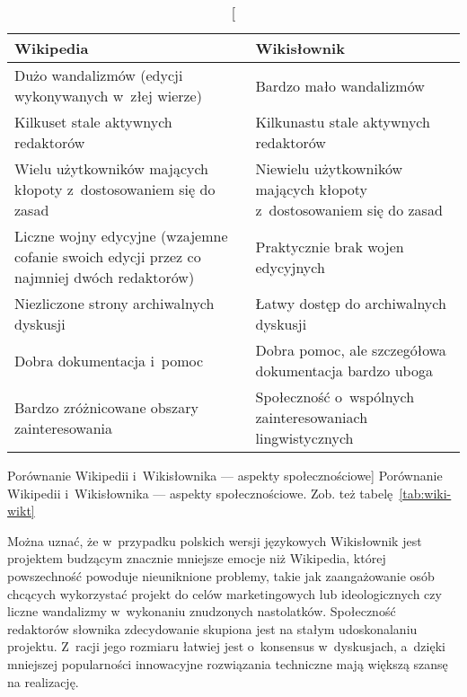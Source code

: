 \begin{table}[h]
\begin{center}
	\begin{tabularx}{\textwidth}{ XX }
		\toprule \textbf{Wikipedia} & \textbf{Wikisłownik} \\
		\midrule Dużo wandalizmów (edycji wykonywanych w~złej wierze)
			& Bardzo mało wandalizmów \\
		\midrule Kilkuset stale aktywnych redaktorów
			& Kilkunastu stale aktywnych redaktorów \\
		\midrule Wielu użytkowników mających kłopoty z~dostosowaniem się do zasad
			& Niewielu użytkowników mających kłopoty z~dostosowaniem się do zasad \\
		\midrule Liczne wojny edycyjne (wzajemne cofanie swoich edycji przez co najmniej dwóch redaktorów)
			& Praktycznie brak wojen edycyjnych \\
		\midrule Niezliczone strony archiwalnych dyskusji
			& Łatwy dostęp do archiwalnych dyskusji \\
		\midrule Dobra dokumentacja i~pomoc
			& Dobra pomoc, ale szczegółowa dokumentacja bardzo uboga \\
		\midrule Bardzo zróżnicowane obszary zainteresowania
			& Społeczność o~wspólnych zainteresowaniach lingwistycznych \\
		\bottomrule
	\end{tabularx}
\caption
	[Porównanie Wikipedii i~Wikisłownika --- aspekty społecznościowe]
	{Porównanie Wikipedii i~Wikisłownika --- aspekty społecznościowe. Zob. też tabelę~\ref{tab:wiki-wikt}}
\label{tab:wiki-wikt2}
\end{center}
\end{table}
Można uznać, że w~przypadku polskich wersji językowych Wikisłownik jest projektem budzącym znacznie mniejsze emocje niż Wikipedia, której powszechność powoduje nieuniknione problemy, takie jak zaangażowanie osób chcących wykorzystać projekt do celów marketingowych lub ideologicznych czy liczne wandalizmy w~wykonaniu znudzonych nastolatków. Społeczność redaktorów słownika zdecydowanie skupiona jest na stałym udoskonalaniu projektu. Z~racji jego rozmiaru łatwiej jest o~konsensus w~dyskusjach, a~dzięki mniejszej popularności innowacyjne rozwiązania techniczne mają większą szansę na realizację.

